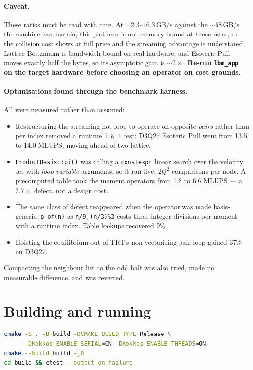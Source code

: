 \documentclass[11pt,a4paper]{article}
\newcommand{\code}[1]{\texttt{\small #1}}
\begin{document}
\paragraph{Caveat.} These ratios must be read with care. At $\sim2.3$--$16.3$\,GB/s
against the $\sim68$\,GB/s the machine can sustain, this platform is not
memory-bound at these rates, so the collision cost shows at full price and the
streaming advantage is understated. Lattice Boltzmann is bandwidth-bound on real
hardware, and Esoteric Pull moves exactly half the bytes, so its asymptotic gain
is $\sim2\times$. \textbf{Re-run \code{lbm\_app} on the target hardware before
choosing an operator on cost grounds.}

\paragraph{Optimisations found through the benchmark harness.} All were measured
rather than assumed:
\begin{itemize}[leftmargin=1.4em,itemsep=2pt]
\item Restructuring the streaming hot loop to operate on opposite \emph{pairs}
  rather than per index removed a runtime \code{i \& 1} test: D3Q27 Esoteric Pull
  went from 13.5 to 14.0 MLUPS, moving ahead of two-lattice.
\item \code{ProductBasis::pi()} was calling a \code{constexpr} linear search over
  the velocity set with \emph{loop-variable} arguments, so it ran live: $2Q^2$
  comparisons per node. A precomputed table took the moment operators from 1.8 to
  6.6 MLUPS --- a $3.7\times$ defect, not a design cost.
\item The same class of defect reappeared when the operator was made
  basis-generic: \code{p\_of(n)} as \code{n/9}, \code{(n/3)\%3} costs three
  integer divisions per moment with a runtime index. Table lookups recovered $9\%$.
\item Hoisting the equilibrium out of TRT's non-vectorising pair loop gained $37\%$
  on D3Q27.
\end{itemize}
Compacting the neighbour list to the odd half was also tried, made no measurable
difference, and was reverted.

\section{Building and running}

\begin{lstlisting}[language=bash]
cmake -S . -B build -DCMAKE_BUILD_TYPE=Release \
      -DKokkos_ENABLE_SERIAL=ON -DKokkos_ENABLE_THREADS=ON
cmake --build build -j8
cd build && ctest --output-on-failure
\end{lstlisting}
\end{document}
